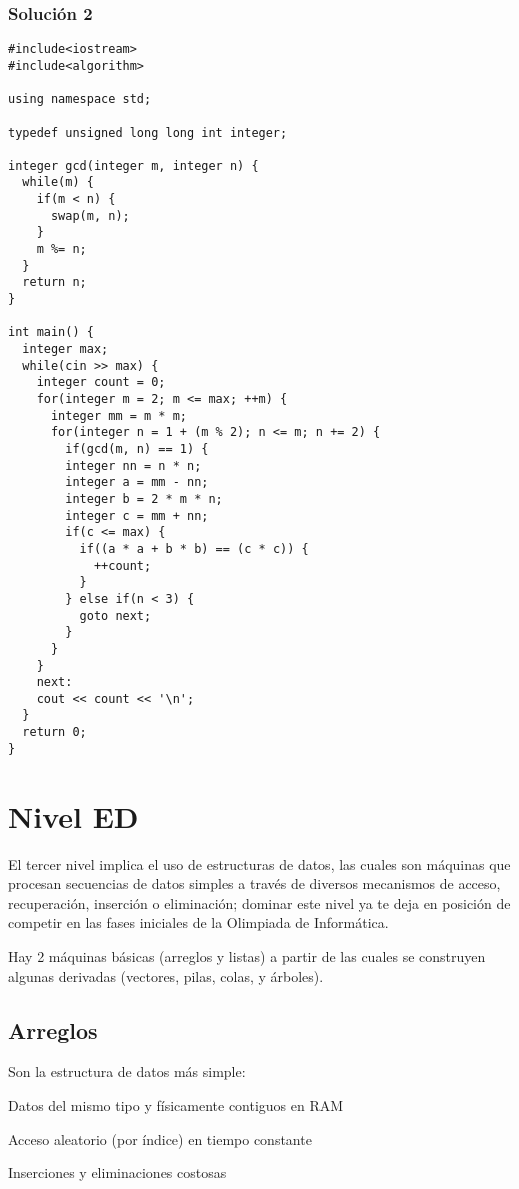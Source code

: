 \documentclass[10pt,letterpaper,twocolumn,spanish]{article}
\begin{document}
\subsubsection*{Solución 2}
\begin{verbatim}
#include<iostream>
#include<algorithm>

using namespace std;

typedef unsigned long long int integer;

integer gcd(integer m, integer n) {
  while(m) {
    if(m < n) {
      swap(m, n);
    }
    m %= n;
  }
  return n;
}

int main() {
  integer max;
  while(cin >> max) {
    integer count = 0;
    for(integer m = 2; m <= max; ++m) {
      integer mm = m * m;
      for(integer n = 1 + (m % 2); n <= m; n += 2) {
        if(gcd(m, n) == 1) {
        integer nn = n * n;
        integer a = mm - nn;
        integer b = 2 * m * n;
        integer c = mm + nn;
        if(c <= max) {
          if((a * a + b * b) == (c * c)) {
            ++count;
          }
        } else if(n < 3) {
          goto next;
        }
      }
    }
    next:
    cout << count << '\n';
  }
  return 0;
}
\end{verbatim}

\section*{Nivel ED}

El tercer nivel implica el uso de estructuras de datos, las cuales son máquinas que procesan secuencias de datos simples a través de diversos mecanismos de acceso, recuperación, inserción o eliminación;
dominar este nivel ya te deja en posición de competir en las fases iniciales de la Olimpiada de Informática.

Hay 2 máquinas básicas (arreglos y listas) a partir de las cuales se construyen algunas derivadas (vectores, pilas, colas, y árboles).

\subsection*{Arreglos}

Son la estructura de datos más simple:
\begin{compactitem}
\item Datos del mismo tipo y físicamente contiguos en RAM
\item Acceso aleatorio (por índice) en tiempo constante
\item Inserciones y eliminaciones costosas
\end{compactitem}
\end{document}

